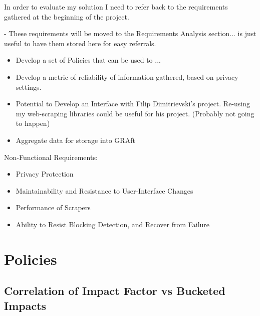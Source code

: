 In order to evaluate my solution I need to refer back to the requirements gathered at the beginning of the project. 

- These requirements will be moved to the Requirements Analysis section... is just useful to have them stored here for easy referrals. 

\begin{itemize}
\item Develop a set of Policies that can be used to ...
\item Develop a metric of reliability of information gathered, based on privacy settings.
\item Potential to Develop an Interface with Filip Dimitrievski's project. Re-using my web-scraping libraries could be useful for his project. (Probably not going to happen)
\item Aggregate data for storage into GRAft
\end{itemize}

Non-Functional Requirements:
\begin{itemize}
\item Privacy Protection
\item Maintainability and Resistance to User-Interface Changes
\item Performance of Scrapers
\item Ability to Resist Blocking Detection, and Recover from Failure
\end{itemize}

\section{Policies}

\subsection{Correlation of Impact Factor vs Bucketed Impacts}

